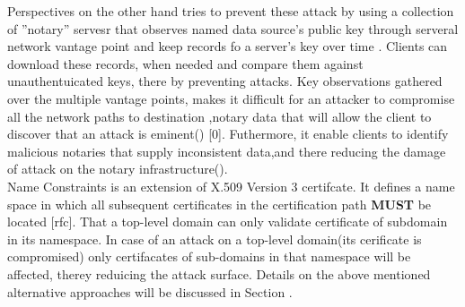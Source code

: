 \indent Perspectives on the other hand tries to prevent these attack by using a collection of ''notary'' servesr that observes named data source's public key through serveral network vantage point and keep records fo a server's key over time . Clients can download these records, when needed and compare them against unauthentuicated keys, there by preventing attacks. Key observations  gathered over the multiple vantage points, makes it difficult for an attacker to compromise all the network paths to destination ,notary data that will allow the client to discover that an attack is eminent() [0]. Futhermore, it enable clients to identify malicious notaries that supply inconsistent data,and there reducing the damage of attack on the notary infrastructure().\\
\indent Name Constraints is an extension of X.509 Version 3 certifcate. It defines a name space in which all subsequent certificates in the certification path \textbf{MUST} be located [rfc]. That a top-level domain can only validate certificate of subdomain in its namespace. In case of an attack on a top-level domain(its cerificate is compromised) only certifacates of sub-domains in that namespace will be affected, therey reduicing the attack surface. Details on the above mentioned alternative approaches will be discussed in Section .    
